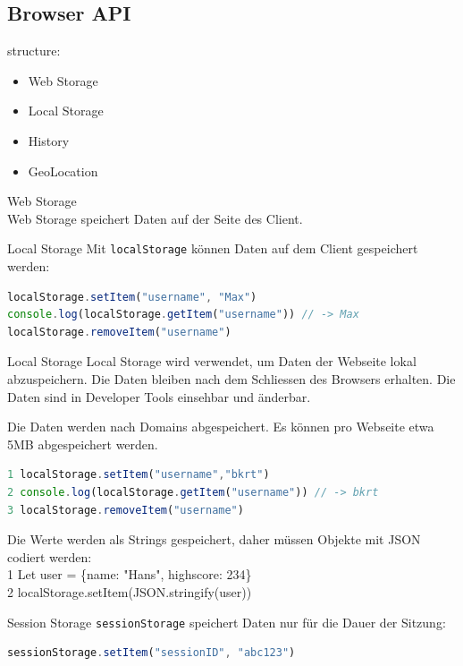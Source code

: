 \pagebreak

\subsection{Browser API}

structure:
\begin{itemize}
    \item Web Storage
    \item Local Storage
    \item History
    \item GeoLocation
\end{itemize}

Web Storage\\
Web Storage speichert Daten auf der Seite des Client.

\begin{definition}{Local Storage}
Mit \texttt{localStorage} können Daten auf dem Client gespeichert werden:
\begin{lstlisting}[language=JavaScript, style=basesmol]
localStorage.setItem("username", "Max")
console.log(localStorage.getItem("username")) // -> Max
localStorage.removeItem("username")
\end{lstlisting}
\end{definition}

\begin{definition}{Local Storage}
Local Storage wird verwendet, um Daten der Webseite lokal abzuspeichern. Die Daten bleiben nach dem Schliessen des Browsers erhalten. Die Daten sind in Developer Tools einsehbar und änderbar.

Die Daten werden nach Domains abgespeichert. Es können pro Webseite etwa 5MB abgespeichert werden.

\begin{lstlisting}[language=JavaScript, style=basesmol]
1 localStorage.setItem("username","bkrt")
2 console.log(localStorage.getItem("username")) // -> bkrt
3 localStorage.removeItem("username")
\end{lstlisting}
\end{definition}

Die Werte werden als Strings gespeichert, daher müssen Objekte mit JSON codiert werden:\\
1 Let user = \{name: "Hans", highscore: 234\}\\
2 localStorage.setItem(JSON.stringify(user))

\begin{definition}{Session Storage}
\texttt{sessionStorage} speichert Daten nur für die Dauer der Sitzung:
\begin{lstlisting}[language=JavaScript, style=basesmol]
sessionStorage.setItem("sessionID", "abc123")
\end{lstlisting}
\end{definition}

